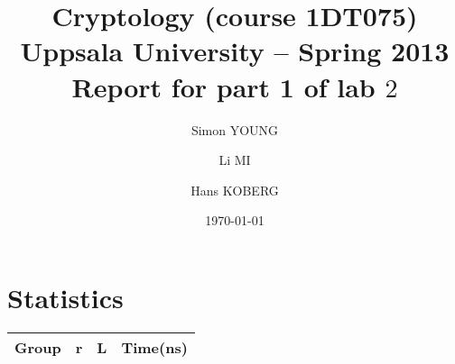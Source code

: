 \documentclass[a4paper,11pt]{article}
\title{\textbf{Cryptology (course 1DT075) \\ 
    Uppsala University -- Spring 2013 \\
    Report for part 1 of lab $2$
  }
}
\author{Simon YOUNG \and Li MI \and Hans KOBERG} %
\date{\today}
\begin{document}
\maketitle

\section{Statistics}
\begin{table}
  \centering
  \begin{tabular}{|c|c|c|c|}
    Group & r & L & Time(ns) \\
    \hline

  \end{tabular}
\end{table}

  
\end{document}
